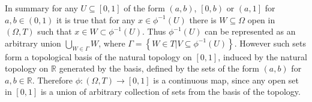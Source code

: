 \documentclass[a4paper]{article}
\newcommand{\obj}[1]{\left\{{#1}\right\}}
\newcommand{\clo}[1]{\left [{#1}\right]}
\newcommand{\brac}[1]{{\left({#1}\right)}}
\begin{document}
In summary for any $U\subseteq \clo{0,1}$ of the form $\brac{a, b}$, $\left [ 0, b \right )$ or $\left ( a, 1 \right ]$ for $a, b \in \brac{0,1}$ it is true that for any $x\in \phi^{-1}\brac{U}$ there is $W\subseteq \Omega$ open in $\brac{\Omega, T}$ such that $x\in W\subset \phi^{-1}\brac{U}$. Thus $\phi^{-1}\brac{U}$ can be represented as an arbitrary union $\bigcup_{W\in \Gamma} W$, where $\Gamma = \obj{ W\in T\vert V\subseteq \phi^{-1}\brac{U}}$. However such sets form a topological basis of the natural topology on $\clo{0,1}$, induced by the natural topology on $\mathbb{R}$ generated by the basis, defined by the sets of the form $\brac{a, b}$ for $a,b \in \mathbb{R}$. Therefore $\phi: \brac{\Omega, T} \to \clo{0,1}$ is a continuous map, since any open set in $\clo{0,1}$ is a union of arbitrary collection of sets from the basis of the topology.








\end{document}

